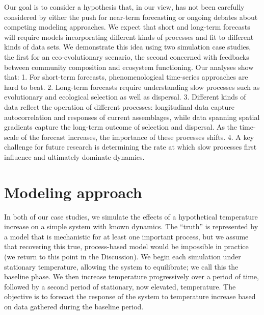\documentclass[11pt]{article}
\begin{document}
Our goal is to consider a hypothesis that, in our view, has not been carefully considered by either the push for near-term forecasting or
ongoing debates about competing modeling approaches. We expect that short and long-term forecasts will require models
incorporating different kinds of processes and fit to different kinds of data sets. We demonstrate this idea using two simulation case studies, the first for an 
eco-evolutionary scenario, the second concerned with feedbacks between community composition and ecosystem functioning.  
Our analyses show that: 
1. For short-term forecasts, phenomenological time-series approaches are hard to beat.
2. Long-term forecasts require understanding slow processes such as evolutionary and ecological selection as well as dispersal.
3. Different kinds of data reflect the operation of different processes: longitudinal data capture autocorrelation and responses of current assemblages, while 
data spanning spatial gradients capture the long-term outcome of selection and dispersal.  As the time-scale of the forecast increases, the importance of these processes shifts.
4. A key challenge for future research is determining the rate at which slow processes first influence and ultimately dominate dynamics.

\section*{Modeling approach}

In both of our case studies, we simulate the effects of a hypothetical temperature increase on a simple system with known dynamics.
The ``truth'' is represented by a model that is mechanistic for at least one important process, but we assume that recovering 
this true, process-based model would be impossible in practice (we return to this point in the Discussion). We begin each simulation
under stationary temperature, allowing the system to equilibrate; we call this the baseline phase. We then increase temperature progressively
over a period of time, followed by a second period of stationary, now elevated, temperature. The objective is to forecast the response of the 
system to temperature increase based on data gathered during the baseline period. 
\end{document}
